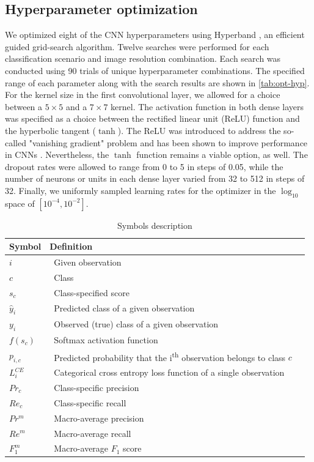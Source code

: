 \documentclass[Journal,letterpaper, SingleSpace, InsideFigs]{ascelike-new}
\begin{document}
\subsection{Hyperparameter optimization}
We optimized eight of the CNN hyperparameters using Hyperband \cite{li2018hyperband}, an efficient guided grid-search algorithm.
Twelve searches were performed for each classification scenario and image resolution combination.
Each search was conducted using 90 trials of unique hyperparameter combinations. The specified range of each parameter along with the search results are shown in \autoref{tab:opt-hyp}. For the kernel size in the first convolutional layer, we allowed for a choice between a $5\times 5$ and a $7\times 7$ kernel. The activation function in both dense layers was specified as a choice between the rectified linear unit (ReLU) function and the hyperbolic tangent ($\tanh$). The ReLU was introduced to address the so-called "vanishing gradient" problem and has been shown to improve performance in CNNs \cite{glorot2011deep}. Nevertheless, the $\tanh$ function remains a viable option, as well. The dropout rates were allowed to range from 0 to 5 in steps of 0.05, while the number of neurons or units in each dense layer varied from 32 to 512 in steps of 32. Finally, we uniformly sampled learning rates for the optimizer in the $\log_{10}$ space of $[10^{-4}, 10^{-2}]$.

\begin{table}[h!]
    \centering
    \begin{tabular}{l l c}\toprule
    \bf Symbol            & \bf Definition  \\\midrule
    $i$     &  \ Given observation \\
    $c$          & \ Class\\
    $s_c$        & \ Class-specified score \\
    $\hat y_i$       & \ Predicted class of a given observation \\
    $y_i$        & \ Observed (true) class of a given observation \\
    $f(s_c)$        & \ Softmax activation function \\
    $p_{i,c}$        & \ Predicted probability that the i\textsuperscript{th} observation belongs to class $c$ \\
    $L^{CE}_i$        & \ Categorical cross entropy loss function of a single observation \\
    $Pr_c$ & \ Class-specific precision \\
    $Re_c$ & \ Class-specific recall \\
    $Pr^m$ & \ Macro-average precision \\
    $Re^m$ & \ Macro-average recall \\
    $F_1^m$ & \ Macro-average $F_1$ score \\\bottomrule
    \end{tabular}
    \caption{Symbols description}
    \label{tab:symbols}
\end{table}
\end{document}
